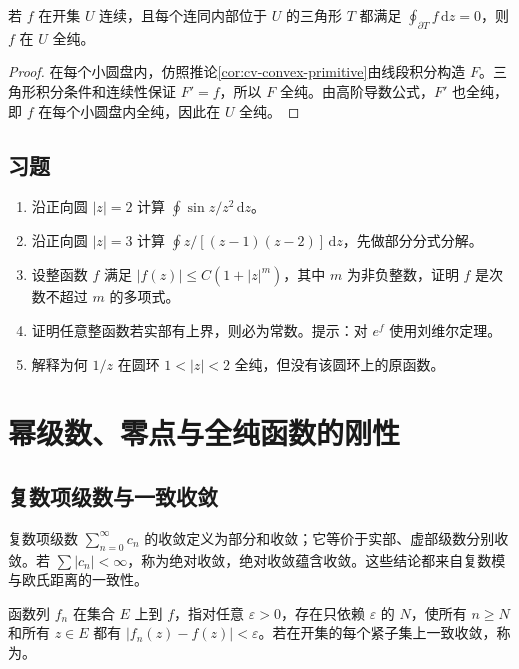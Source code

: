 \documentclass[UTF8,12pt,a4paper,fontset=fandol]{ctexbook}
\begin{document}
\begin{theorem}[莫雷拉定理]
\label{thm:cv-morera}
若 $f$ 在开集 $U$ 连续，且每个连同内部位于 $U$ 的三角形 $T$ 都满足 $\oint_{\partial T}f\,\mathrm dz=0$，则 $f$ 在 $U$ 全纯。
\end{theorem}
\begin{proof}
在每个小圆盘内，仿照推论\ref{cor:cv-convex-primitive}由线段积分构造 $F$。三角形积分条件和连续性保证 $F'=f$，所以 $F$ 全纯。由高阶导数公式，$F'$ 也全纯，即 $f$ 在每个小圆盘内全纯，因此在 $U$ 全纯。
\end{proof}

\section{习题}
\label{sec:cv-cauchy-ex}
\begin{enumerate}
 \item 沿正向圆 $|z|=2$ 计算 $\oint\sin z/z^2\,\mathrm dz$。
 \item 沿正向圆 $|z|=3$ 计算 $\oint z/[(z-1)(z-2)]\,\mathrm dz$，先做部分分式分解。
 \item 设整函数 $f$ 满足 $|f(z)|\le C(1+|z|^m)$，其中 $m$ 为非负整数，证明 $f$ 是次数不超过 $m$ 的多项式。
 \item 证明任意整函数若实部有上界，则必为常数。提示：对 $e^f$ 使用刘维尔定理。
 \item 解释为何 $1/z$ 在圆环 $1<|z|<2$ 全纯，但没有该圆环上的原函数。
\end{enumerate}

\chapter{幂级数、零点与全纯函数的刚性}
\label{chap:cv-series}

\section{复数项级数与一致收敛}

复数项级数 $\sum_{n=0}^\infty c_n$ 的收敛定义为部分和收敛；它等价于实部、虚部级数分别收敛。若 $\sum|c_n|<\infty$，称为绝对收敛，绝对收敛蕴含收敛。这些结论都来自复数模与欧氏距离的一致性。

\begin{definition}[一致收敛与局部一致收敛]
函数列 $f_n$ 在集合 $E$ 上到 $f$，指对任意 $\varepsilon>0$，存在只依赖 $\varepsilon$ 的 $N$，使所有 $n\ge N$ 和所有 $z\in E$ 都有 $|f_n(z)-f(z)|<\varepsilon$。若在开集的每个紧子集上一致收敛，称为。
\end{definition}
\end{document}
